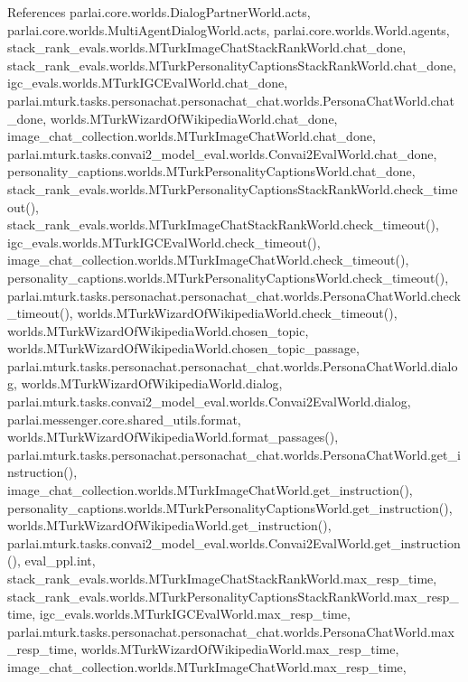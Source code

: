 References parlai.\+core.\+worlds.\+Dialog\+Partner\+World.\+acts, parlai.\+core.\+worlds.\+Multi\+Agent\+Dialog\+World.\+acts, parlai.\+core.\+worlds.\+World.\+agents, stack\+\_\+rank\+\_\+evals.\+worlds.\+M\+Turk\+Image\+Chat\+Stack\+Rank\+World.\+chat\+\_\+done, stack\+\_\+rank\+\_\+evals.\+worlds.\+M\+Turk\+Personality\+Captions\+Stack\+Rank\+World.\+chat\+\_\+done, igc\+\_\+evals.\+worlds.\+M\+Turk\+I\+G\+C\+Eval\+World.\+chat\+\_\+done, parlai.\+mturk.\+tasks.\+personachat.\+personachat\+\_\+chat.\+worlds.\+Persona\+Chat\+World.\+chat\+\_\+done, worlds.\+M\+Turk\+Wizard\+Of\+Wikipedia\+World.\+chat\+\_\+done, image\+\_\+chat\+\_\+collection.\+worlds.\+M\+Turk\+Image\+Chat\+World.\+chat\+\_\+done, parlai.\+mturk.\+tasks.\+convai2\+\_\+model\+\_\+eval.\+worlds.\+Convai2\+Eval\+World.\+chat\+\_\+done, personality\+\_\+captions.\+worlds.\+M\+Turk\+Personality\+Captions\+World.\+chat\+\_\+done, stack\+\_\+rank\+\_\+evals.\+worlds.\+M\+Turk\+Personality\+Captions\+Stack\+Rank\+World.\+check\+\_\+timeout(), stack\+\_\+rank\+\_\+evals.\+worlds.\+M\+Turk\+Image\+Chat\+Stack\+Rank\+World.\+check\+\_\+timeout(), igc\+\_\+evals.\+worlds.\+M\+Turk\+I\+G\+C\+Eval\+World.\+check\+\_\+timeout(), image\+\_\+chat\+\_\+collection.\+worlds.\+M\+Turk\+Image\+Chat\+World.\+check\+\_\+timeout(), personality\+\_\+captions.\+worlds.\+M\+Turk\+Personality\+Captions\+World.\+check\+\_\+timeout(), parlai.\+mturk.\+tasks.\+personachat.\+personachat\+\_\+chat.\+worlds.\+Persona\+Chat\+World.\+check\+\_\+timeout(), worlds.\+M\+Turk\+Wizard\+Of\+Wikipedia\+World.\+check\+\_\+timeout(), worlds.\+M\+Turk\+Wizard\+Of\+Wikipedia\+World.\+chosen\+\_\+topic, worlds.\+M\+Turk\+Wizard\+Of\+Wikipedia\+World.\+chosen\+\_\+topic\+\_\+passage, parlai.\+mturk.\+tasks.\+personachat.\+personachat\+\_\+chat.\+worlds.\+Persona\+Chat\+World.\+dialog, worlds.\+M\+Turk\+Wizard\+Of\+Wikipedia\+World.\+dialog, parlai.\+mturk.\+tasks.\+convai2\+\_\+model\+\_\+eval.\+worlds.\+Convai2\+Eval\+World.\+dialog, parlai.\+messenger.\+core.\+shared\+\_\+utils.\+format, worlds.\+M\+Turk\+Wizard\+Of\+Wikipedia\+World.\+format\+\_\+passages(), parlai.\+mturk.\+tasks.\+personachat.\+personachat\+\_\+chat.\+worlds.\+Persona\+Chat\+World.\+get\+\_\+instruction(), image\+\_\+chat\+\_\+collection.\+worlds.\+M\+Turk\+Image\+Chat\+World.\+get\+\_\+instruction(), personality\+\_\+captions.\+worlds.\+M\+Turk\+Personality\+Captions\+World.\+get\+\_\+instruction(), worlds.\+M\+Turk\+Wizard\+Of\+Wikipedia\+World.\+get\+\_\+instruction(), parlai.\+mturk.\+tasks.\+convai2\+\_\+model\+\_\+eval.\+worlds.\+Convai2\+Eval\+World.\+get\+\_\+instruction(), eval\+\_\+ppl.\+int, stack\+\_\+rank\+\_\+evals.\+worlds.\+M\+Turk\+Image\+Chat\+Stack\+Rank\+World.\+max\+\_\+resp\+\_\+time, stack\+\_\+rank\+\_\+evals.\+worlds.\+M\+Turk\+Personality\+Captions\+Stack\+Rank\+World.\+max\+\_\+resp\+\_\+time, igc\+\_\+evals.\+worlds.\+M\+Turk\+I\+G\+C\+Eval\+World.\+max\+\_\+resp\+\_\+time, parlai.\+mturk.\+tasks.\+personachat.\+personachat\+\_\+chat.\+worlds.\+Persona\+Chat\+World.\+max\+\_\+resp\+\_\+time, worlds.\+M\+Turk\+Wizard\+Of\+Wikipedia\+World.\+max\+\_\+resp\+\_\+time, image\+\_\+chat\+\_\+collection.\+worlds.\+M\+Turk\+Image\+Chat\+World.\+max\+\_\+resp\+\_\+time, 